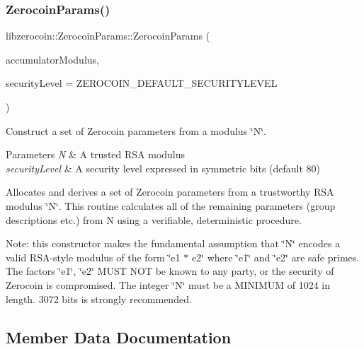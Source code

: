 \subsubsection{\texorpdfstring{ZerocoinParams()}{ZerocoinParams()}}
{\footnotesize\ttfamily libzerocoin\+::\+Zerocoin\+Params\+::\+Zerocoin\+Params (\begin{DoxyParamCaption}\item[{\mbox{\hyperlink{class_c_big_num}{C\+Big\+Num}}}]{accumulator\+Modulus,  }\item[{uint32\+\_\+t}]{security\+Level = {\ttfamily ZEROCOIN\+\_\+DEFAULT\+\_\+SECURITYLEVEL} }\end{DoxyParamCaption})}



Construct a set of Zerocoin parameters from a modulus \char`\"{}\+N\char`\"{}. 


\begin{DoxyParams}{Parameters}
{\em N} & A trusted R\+SA modulus \\
\hline
{\em security\+Level} & A security level expressed in symmetric bits (default 80)\\
\hline
\end{DoxyParams}
Allocates and derives a set of Zerocoin parameters from a trustworthy R\+SA modulus \char`\"{}\+N\char`\"{}. This routine calculates all of the remaining parameters (group descriptions etc.) from N using a verifiable, deterministic procedure.

Note\+: this constructor makes the fundamental assumption that \char`\"{}\+N\char`\"{} encodes a valid R\+S\+A-\/style modulus of the form \char`\"{}e1 $\ast$ e2\char`\"{} where \char`\"{}e1\char`\"{} and \char`\"{}e2\char`\"{} are safe primes. The factors \char`\"{}e1\char`\"{}, \char`\"{}e2\char`\"{} M\+U\+ST N\+OT be known to any party, or the security of Zerocoin is compromised. The integer \char`\"{}\+N\char`\"{} must be a M\+I\+N\+I\+M\+UM of 1024 in length. 3072 bits is strongly recommended. 

\subsection{Member Data Documentation}
\mbox{\label{classlibzerocoin_1_1_zerocoin_params_a4d3f02e31698e16f5edd844d3edc4b35}} 
